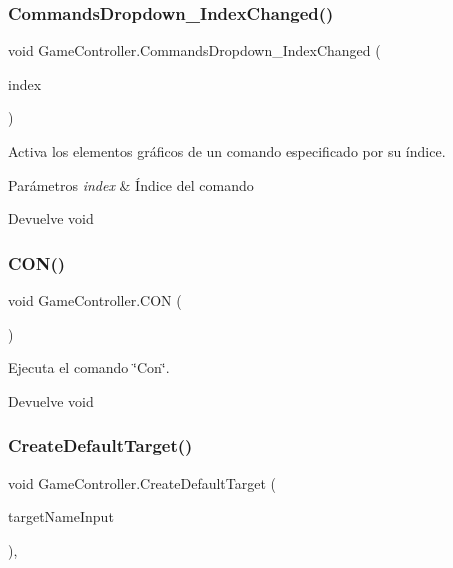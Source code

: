 \subsubsection{\texorpdfstring{CommandsDropdown\_IndexChanged()}{CommandsDropdown\_IndexChanged()}}
{\footnotesize\ttfamily void Game\+Controller.\+Commands\+Dropdown\+\_\+\+Index\+Changed (\begin{DoxyParamCaption}\item[{int}]{index }\end{DoxyParamCaption})\hspace{0.3cm}{\ttfamily [inline]}}

Activa los elementos gráficos de un comando especificado por su índice. 
\begin{DoxyParams}{Parámetros}
{\em index} & Índice del comando \\
\hline
\end{DoxyParams}
\begin{DoxyReturn}{Devuelve}
void 
\end{DoxyReturn}
\mbox{\label{class_game_controller_ae9fc70a12ad70871780529854ea12d9c}} 
\subsubsection{\texorpdfstring{CON()}{CON()}}
{\footnotesize\ttfamily void Game\+Controller.\+C\+ON (\begin{DoxyParamCaption}{ }\end{DoxyParamCaption})\hspace{0.3cm}{\ttfamily [inline]}}

Ejecuta el comando \char`\"{}\+Con\char`\"{}. \begin{DoxyReturn}{Devuelve}
void 
\end{DoxyReturn}
\mbox{\label{class_game_controller_afb7da85e39dbf57ae9a540e9dcff034a}} 
\subsubsection{\texorpdfstring{CreateDefaultTarget()}{CreateDefaultTarget()}}
{\footnotesize\ttfamily void Game\+Controller.\+Create\+Default\+Target (\begin{DoxyParamCaption}\item[{Input\+Field}]{target\+Name\+Input }\end{DoxyParamCaption})\hspace{0.3cm}{\ttfamily [inline]}, {\ttfamily [private]}}

